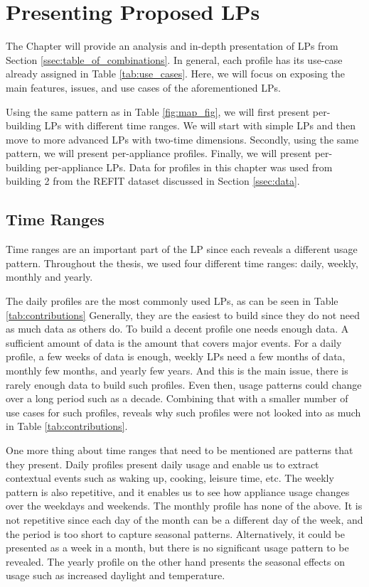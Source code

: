 \chapter{Presenting Proposed LPs}
\label{chapter4}

The Chapter will provide an analysis and in-depth presentation of LPs from Section \ref{ssec:table_of_combinations}.
In general, each profile has its use-case already assigned in Table \ref{tab:use_cases}.
Here, we will focus on exposing the main features, issues, and use cases of the aforementioned LPs. 

Using the same pattern as in Table \ref{fig:map_fig}, we will first present per-building LPs with different time ranges.
We will start with simple LPs and then move to more advanced LPs with two-time dimensions.
Secondly, using the same pattern, we will present per-appliance profiles.
Finally, we will present per-building per-appliance LPs.
Data for profiles in this chapter was used from building 2 from the REFIT dataset discussed in Section \ref{ssec:data}.
 
\section{Time Ranges}
\label{sec:time_range}

Time ranges are an important part of the LP since each reveals a different usage pattern.
Throughout the thesis, we used four different time ranges: daily, weekly, monthly and yearly.

The daily profiles are the most commonly used LPs, as can be seen in Table \ref{tab:contributions}
Generally, they are the easiest to build since they do not need as much data as others do.
To build a decent profile one needs enough data. 
A sufficient amount of data is the amount that covers major events.
For a daily profile, a few weeks of data is enough, weekly LPs need a few months of data, monthly few months, and yearly few years.
And this is the main issue, there is rarely enough data to build such profiles.
Even then, usage patterns could change over a long period such as a decade.
Combining that with a smaller number of use cases for such profiles, reveals why such profiles were not looked into as much in Table \ref{tab:contributions}.

One more thing about time ranges that need to be mentioned are patterns that they present.
Daily profiles present daily usage and enable us to extract contextual events such as waking up, cooking, leisure time, etc.
The weekly pattern is also repetitive, and it enables us to see how appliance usage changes over the weekdays and weekends.
The monthly profile has none of the above. It is not repetitive since each day of the month can be a different day of the week, and the period is too short to capture seasonal patterns.
Alternatively, it could be presented as a week in a month, but there is no significant usage pattern to be revealed.
The yearly profile on the other hand presents the seasonal effects on usage such as increased daylight and temperature. 

